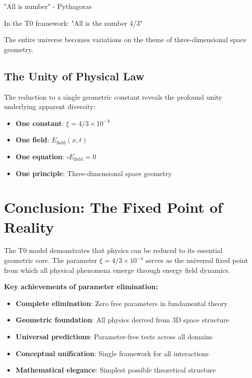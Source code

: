 \documentclass[12pt,a4paper]{report}
\begin{document}
\begin{tcolorbox}[colback=blue!5!white,colframe=blue!75!black,title=Pythagorean Insight]
	"All is number" - Pythagoras
	
	In the T0 framework: "All is the number 4/3"
	
	The entire universe becomes variations on the theme of three-dimensional space geometry.
\end{tcolorbox}

\subsection{The Unity of Physical Law}
\label{subsec:unity_physical_law}

The reduction to a single geometric constant reveals the profound unity underlying apparent diversity:

\begin{itemize}
	\item \textbf{One constant}: $\xi = 4/3 \times 10^{-4}$
	\item \textbf{One field}: $E_{\text{field}}(x,t)$
	\item \textbf{One equation}: $\square E_{\text{field}} = 0$
	\item \textbf{One principle}: Three-dimensional space geometry
\end{itemize}

\section{Conclusion: The Fixed Point of Reality}
\label{sec:conclusion_fixed_point}

The T0 model demonstrates that physics can be reduced to its essential geometric core. The parameter $\xi = 4/3 \times 10^{-4}$ serves as the universal fixed point from which all physical phenomena emerge through energy field dynamics.

\textbf{Key achievements of parameter elimination:}

\begin{itemize}
	\item \textbf{Complete elimination}: Zero free parameters in fundamental theory
	\item \textbf{Geometric foundation}: All physics derived from 3D space structure
	\item \textbf{Universal predictions}: Parameter-free tests across all domains
	\item \textbf{Conceptual unification}: Single framework for all interactions
	\item \textbf{Mathematical elegance}: Simplest possible theoretical structure
\end{itemize}
\end{document}
